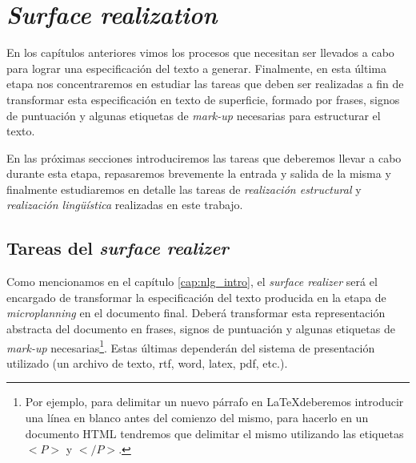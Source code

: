 \chapter{\textit{Surface realization}}
\label{cap:realization}
En los capítulos anteriores vimos los procesos que necesitan ser llevados a cabo para lograr una especificación del texto a generar. Finalmente, en esta última etapa nos concentraremos en estudiar las tareas que deben ser realizadas a fin de transformar esta especificación en texto de superficie, formado por frases, signos de puntuación y algunas etiquetas de \textit{mark-up} necesarias para estructurar el texto.

En las próximas secciones introduciremos las tareas que deberemos llevar a cabo durante esta etapa, repasaremos brevemente la entrada y salida de la misma y finalmente estudiaremos en detalle las tareas de \emph{realización estructural} y \emph{realización lingüística} realizadas en este trabajo.


\section{Tareas del \textit{surface realizer}}

Como mencionamos en el capítulo \ref{cap:nlg_intro}, el \textit{surface realizer} será el encargado de transformar la especificación del texto producida en la etapa de \textit{microplanning} en el documento final. Deberá transformar esta representación abstracta del documento en frases, signos de puntuación y algunas etiquetas de \textit{mark-up} necesarias\footnote{Por ejemplo, para delimitar un nuevo párrafo en \LaTeX deberemos introducir una línea en blanco antes del comienzo del mismo, para hacerlo en un documento HTML tendremos que delimitar el mismo utilizando las etiquetas $<P>$ y $</P>$.}. Estas últimas dependerán del sistema de presentación utilizado (un archivo de texto, rtf, word, latex, pdf, etc.).

